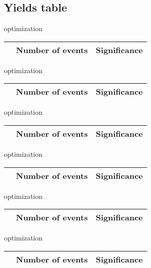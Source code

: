 \subsection{Yields table}
\begin{frame}{optimization}
\tiny

\begin{tabular}{|c|c|c|}
\hline
& Number of events & Significance \\
\hline

\end{tabular}
\end{frame}

\begin{frame}{optimization}
\tiny

\begin{tabular}{|c|c|c|}
\hline
& Number of events & Significance \\
\hline

\end{tabular}
\end{frame}

\begin{frame}{optimization}
\tiny

\begin{tabular}{|c|c|c|}
\hline
& Number of events & Significance \\
\hline

\end{tabular}
\end{frame}

\begin{frame}{optimization}
\tiny

\begin{tabular}{|c|c|c|}
\hline
& Number of events & Significance \\
\hline

\end{tabular}
\end{frame}

\begin{frame}{optimization}
\tiny

\begin{tabular}{|c|c|c|}
\hline
& Number of events & Significance \\
\hline

\end{tabular}
\end{frame}

\begin{frame}{optimization}
\tiny

\begin{tabular}{|c|c|c|}
\hline
& Number of events & Significance \\
\hline

\end{tabular}
\end{frame}

